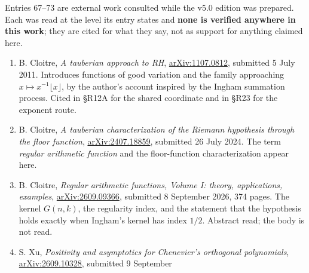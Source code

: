 \documentclass[
  11pt,
]{book}
\begin{document}
Entries 67--73 are external work consulted while the v5.0 edition was
prepared. Each was read at the level its entry states and \textbf{none
is verified anywhere in this work}; they are cited for what they say,
not as support for anything claimed here.

\begin{enumerate}
\def\labelenumi{\arabic{enumi}.}
\setcounter{enumi}{66}
\item
  B. Cloitre, \emph{A tauberian approach to RH},
  \href{https://arxiv.org/abs/1107.0812}{arXiv:1107.0812}, submitted 5
  July 2011. Introduces functions of good variation and the family
  approaching \(x\mapsto x^{-1}\lfloor x\rfloor\), by the author's
  account inspired by the Ingham summation process. Cited in §R12A for
  the shared coordinate and in §R23 for the exponent route.
\item
  B. Cloitre, \emph{A tauberian characterization of the Riemann
  hypothesis through the floor function},
  \href{https://arxiv.org/abs/2407.18859}{arXiv:2407.18859}, submitted
  26 July 2024. The term \emph{regular arithmetic function} and the
  floor-function characterization appear here.
\item
  B. Cloitre, \emph{Regular arithmetic functions, Volume I: theory,
  applications, examples},
  \href{https://arxiv.org/abs/2609.09366}{arXiv:2609.09366}, submitted 8
  September 2026, 374 pages. The kernel \(G(n,k)\), the regularity
  index, and the statement that the hypothesis holds exactly when
  Ingham's kernel has index \(1/2\). Abstract read; the body is not
  read.
\item
  S. Xu, \emph{Positivity and asymptotics for Chenevier's orthogonal
  polynomials},
  \href{https://arxiv.org/abs/2609.10328}{arXiv:2609.10328}, submitted 9
  September


\end{enumerate}
\end{document}
